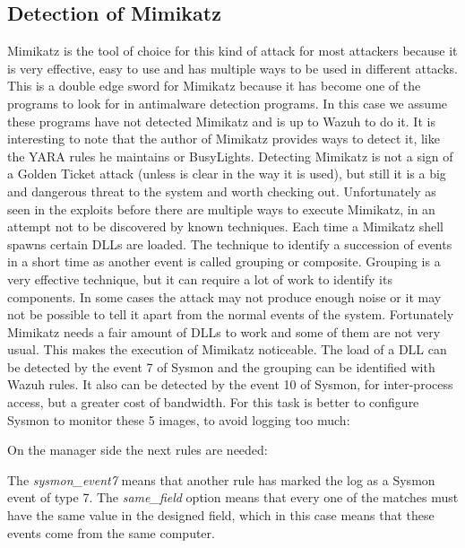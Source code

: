 \subsection{Detection of Mimikatz}
Mimikatz is the tool of choice for this kind of attack for most attackers because it is very effective, easy to use and has multiple ways to be used in different attacks\cite{mimikatz_github}\cite{mimikatz_details}. This is a double edge sword for Mimikatz because it has become one of the programs to look for in antimalware detection programs. In this case we assume these programs have not detected Mimikatz and is up to Wazuh to do it. It is interesting to note that the author of Mimikatz provides ways to detect it, like the YARA rules he maintains\cite{mimikatz_github} or BusyLights\cite{understanding_powersploit_mimikatz}.
\linej
\linej
Detecting Mimikatz is not a sign of a Golden Ticket attack (unless is clear in the way it is used), but still it is a big and dangerous threat to the system and worth checking out.
\linej
Unfortunately as seen in the exploits before there are multiple ways to execute Mimikatz, in an attempt not to be discovered by known techniques.
\linej
\linej
Each time a Mimikatz shell spawns certain DLLs are loaded. The technique to identify a succession of events in a short time as another event is called grouping or composite.
Grouping is a very effective technique, but it can require a lot of work to identify its components. In some cases the attack may not produce enough noise or it may not be possible to tell it apart from the normal events of the system\cite{sysmon}\cite{sysmon_event_7_mimikatz}.
\linej
Fortunately Mimikatz needs a fair amount of DLLs to work and some of them are not very usual. This makes the execution of Mimikatz noticeable.
\linej
\linej
 The load of a DLL can be detected by the event 7 of Sysmon and the grouping can be identified with Wazuh rules. It also can be detected by the event 10 of Sysmon, for inter-process access, but a greater cost of bandwidth.
For this task is better to configure Sysmon to monitor these 5 images, to avoid logging too much:
\linej

\linej
On the manager side the next rules are needed:
\linej

The \textit{sysmon\_event7} means that another rule has marked the log as a Sysmon event of type 7.
\linej
The \textit{same\_field} option means that every one of the matches must have the same value in the designed field, which in this case means that these events come from the same computer.
